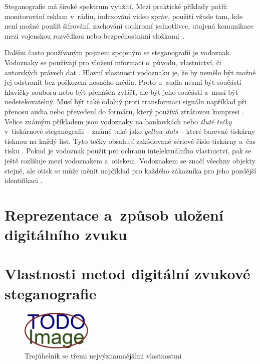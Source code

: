 Steganografie má široké spektrum využití. Mezi praktické příklady patří:
monitorování reklam v~rádiu, indexování video zpráv, použití všude tam, kde
není možné použít šifrování, zachování soukromí jednotlivce, utajená komunikace
mezi vojenskou rozvědkou nebo bezpečnostními složkami~\cite{Dutta2020}.

Dalším často používaným pojmem spojeným se steganografií je vodoznak. Vodoznaky
se používají pro vložení informací o~původu, vlastnictví, či autorských právech
dat \cite{Djebbar2012}\cite{Dutta2020}\cite{Swanson1998}. Hlavní vlastností
vodoznaku je, že by nemělo být možné jej odstranit bez poškození nosného média.
Proto u~audia nesmí být součástí hlavičky souboru nebo být přenášen zvlášť, ale
být jeho součástí a~musí být nedetekovatelný. Musí být také odolný proti
transformaci signálu například při přenosu audia nebo převedení do formátu,
který používá ztrátovou kompresi \cite{Swanson1998}. Velice známým příkladem
jsou vodoznaky na bankovkách nebo \textit{žluté tečky} v~tiskárnové
steganografii -- známé také jako \textit{yellow dots} -- které barevné tiskárny
tisknou na každý list. Tyto tečky obsahují zakódované sériové číslo tiskárny
a~čas tisku \cite{Dutta2020}. Pokud je vodoznak použit pro ochranu intelektuálního
vlastnictví, pak se ještě rozlišuje mezi vodoznakem a~otiskem. Vodoznakem se značí
všechny objekty stejně, ale otisk se může měnit například pro každého zákazníka
pro jeho pozdější identifikaci \cite{Swanson1998}.

\section{Reprezentace a~způsob uložení digitálního zvuku}
\label{sec:digital-sound-representation}


\blindtext

\blindtext

\section{Vlastnosti metod digitální zvukové steganografie}
\label{sec:method-properties}


\blindtext

\blindtext

\begin{figure}[hbt]
    \centering
    \includegraphics[width=0.3\textwidth]{obrazky/placeholder.pdf}
    \caption{Trojúhelník se třemi nejvýznamnějšími vlastnostmi}
    \label{pic:method-property-triangle}
\end{figure}

